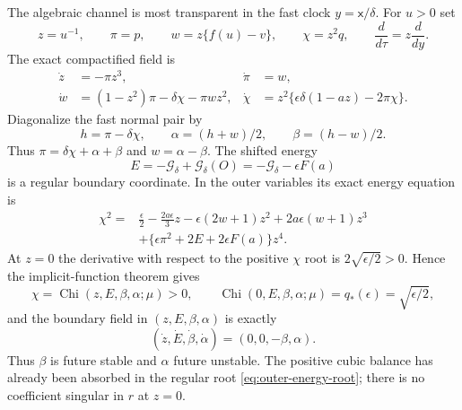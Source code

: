 \documentclass[11pt,reqno]{amsart}
\numberwithin{equation}{section}
\theoremstyle{definition}
\theoremstyle{remark}
\newcommand{\cG}{\mathcal G}
\newcommand{\Chi}{\operatorname{Chi}}
\begin{document}
The algebraic channel is most transparent in the fast clock
$y=\mathsf x/\delta$.  For $u>0$ set
\begin{equation}\label{eq:outer-vars}
 z=u^{-1},\qquad \pi=p,\qquad
 w=z\{f(u)-v\},\qquad \chi=z^2q,\qquad
 \frac d{d\tau}=z\frac d{dy}.
\end{equation}
The exact compactified field is
\begin{equation}\label{eq:outer-field}
 \begin{aligned}
  \dot z&=-\pi z^3,& \dot\pi&=w,\\
  \dot w&=(1-z^2)\pi-\delta\chi-\pi wz^2,&
  \dot\chi&=z^2\{\epsilon\delta(1-az)-2\pi\chi\}.
 \end{aligned}
\end{equation}
Diagonalize the fast normal pair by
\begin{equation}\label{eq:outer-normal}
 h=\pi-\delta\chi,\qquad
 \alpha=(h+w)/2,\qquad \beta=(h-w)/2.
\end{equation}
Thus $\pi=\delta\chi+\alpha+\beta$ and $w=\alpha-\beta$.  The shifted
energy
\begin{equation}\label{eq:outer-energy}
 E=-\cG_\delta+\cG_\delta(O)=-\cG_\delta-\epsilon F(a)
\end{equation}
is a regular boundary coordinate.  In the outer variables its exact energy
equation is
\begin{equation}\label{eq:outer-energy-equation}
 \begin{aligned}
 \chi^2={}&\frac\epsilon2-\frac{2a\epsilon}{3}z
 -\epsilon(2w+1)z^2+2a\epsilon(w+1)z^3\\
 &+\{\epsilon\pi^2+2E+2\epsilon F(a)\}z^4 .
 \end{aligned}
\end{equation}
At $z=0$ the derivative with respect to the positive $\chi$ root is
$2\sqrt{\epsilon/2}>0$.  Hence the implicit-function theorem gives
\begin{equation}\label{eq:outer-energy-root}
 \chi=\Chi(z,E,\beta,\alpha;\mu)>0,\qquad
 \Chi(0,E,\beta,\alpha;\mu)=q_*(\epsilon)=\sqrt{\epsilon/2},
\end{equation}
and the boundary field in $(z,E,\beta,\alpha)$ is exactly
\begin{equation}\label{eq:outer-boundary}
 (\dot z,\dot E,\dot\beta,\dot\alpha)=(0,0,-\beta,\alpha).
\end{equation}
Thus $\beta$ is future stable and $\alpha$ future unstable.  The positive
cubic balance has already been absorbed in the regular root
\eqref{eq:outer-energy-root}; there is no coefficient singular in $r$ at
$z=0$.
\end{document}
